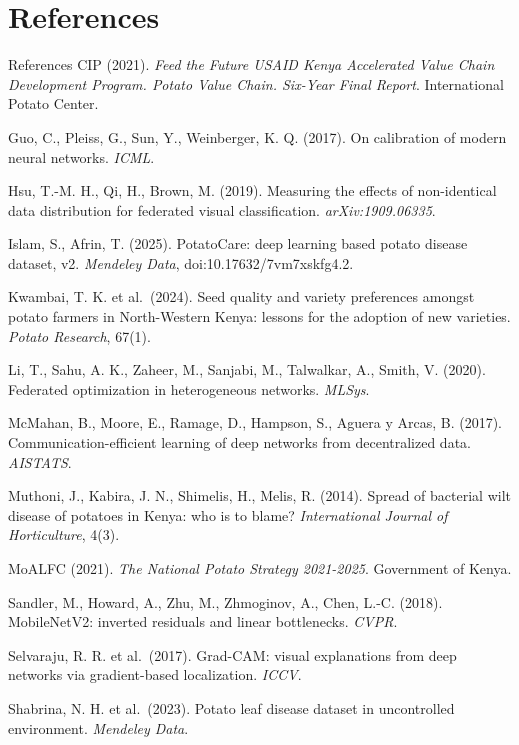 \documentclass[11pt, aspectratio=169]{beamer}
\begin{document}
\section{References}
\begin{frame}[t]{References}
  \bodys
  \setlength\parskip{0.25em}
  CIP (2021). \emph{Feed the Future USAID Kenya Accelerated Value Chain Development Program. Potato Value Chain. Six-Year Final Report}. International Potato Center.\par
  Guo, C., Pleiss, G., Sun, Y., Weinberger, K. Q. (2017). On calibration of modern neural networks. \emph{ICML}.\par
  Hsu, T.-M. H., Qi, H., Brown, M. (2019). Measuring the effects of non-identical data distribution for federated visual classification. \emph{arXiv:1909.06335}.\par
  Islam, S., Afrin, T. (2025). PotatoCare: deep learning based potato disease dataset, v2. \emph{Mendeley Data}, doi:10.17632/7vm7xskfg4.2.\par
  Kwambai, T. K. et al.\ (2024). Seed quality and variety preferences amongst potato farmers in North-Western Kenya: lessons for the adoption of new varieties. \emph{Potato Research}, 67(1).\par
  Li, T., Sahu, A. K., Zaheer, M., Sanjabi, M., Talwalkar, A., Smith, V. (2020). Federated optimization in heterogeneous networks. \emph{MLSys}.\par
  McMahan, B., Moore, E., Ramage, D., Hampson, S., Aguera y Arcas, B. (2017). Communication-efficient learning of deep networks from decentralized data. \emph{AISTATS}.\par
  Muthoni, J., Kabira, J. N., Shimelis, H., Melis, R. (2014). Spread of bacterial wilt disease of potatoes in Kenya: who is to blame? \emph{International Journal of Horticulture}, 4(3).\par
  MoALFC (2021). \emph{The National Potato Strategy 2021-2025}. Government of Kenya.\par
  Sandler, M., Howard, A., Zhu, M., Zhmoginov, A., Chen, L.-C. (2018). MobileNetV2: inverted residuals and linear bottlenecks. \emph{CVPR}.\par
  Selvaraju, R. R. et al.\ (2017). Grad-CAM: visual explanations from deep networks via gradient-based localization. \emph{ICCV}.\par
  Shabrina, N. H. et al.\ (2023). Potato leaf disease dataset in uncontrolled environment. \emph{Mendeley Data}.
\end{frame}
\end{document}

